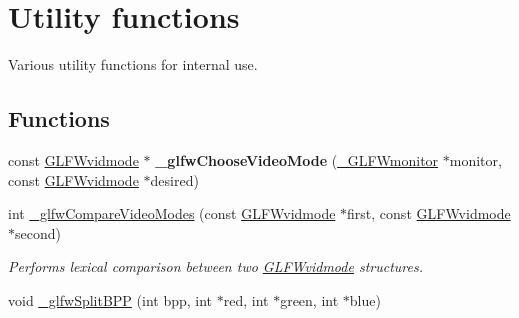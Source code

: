 \hypertarget{group__utility}{}\section{Utility functions}
\label{group__utility}


Various utility functions for internal use.  


\subsection*{Functions}
\begin{DoxyCompactItemize}
\item 
\hypertarget{group__utility_gacf6b57bbbf447209081a27abdc00465c}{}const \hyperlink{structGLFWvidmode}{G\+L\+F\+Wvidmode} $\ast$ {\bfseries \+\_\+glfw\+Choose\+Video\+Mode} (\hyperlink{struct__GLFWmonitor}{\+\_\+\+G\+L\+F\+Wmonitor} $\ast$monitor, const \hyperlink{structGLFWvidmode}{G\+L\+F\+Wvidmode} $\ast$desired)\label{group__utility_gacf6b57bbbf447209081a27abdc00465c}

\item 
\hypertarget{group__utility_gaaca82db2d0453cb2895b0aa5e495387f}{}int \hyperlink{group__utility_gaaca82db2d0453cb2895b0aa5e495387f}{\+\_\+glfw\+Compare\+Video\+Modes} (const \hyperlink{structGLFWvidmode}{G\+L\+F\+Wvidmode} $\ast$first, const \hyperlink{structGLFWvidmode}{G\+L\+F\+Wvidmode} $\ast$second)\label{group__utility_gaaca82db2d0453cb2895b0aa5e495387f}

\begin{DoxyCompactList}\small\item\em Performs lexical comparison between two \hyperlink{structGLFWvidmode}{G\+L\+F\+Wvidmode} structures. \end{DoxyCompactList}\item 
\hypertarget{group__utility_ga3f83dfd3a9beffeba9bac74ec15071a0}{}void \hyperlink{group__utility_ga3f83dfd3a9beffeba9bac74ec15071a0}{\+\_\+glfw\+Split\+B\+P\+P} (int bpp, int $\ast$red, int $\ast$green, int $\ast$blue)\label{group__utility_ga3f83dfd3a9beffeba9bac74ec15071a0}


\end{DoxyCompactItemize}
